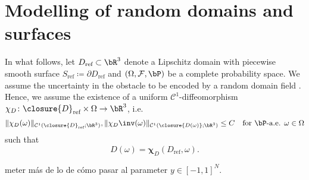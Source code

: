 \section{Modelling of random domains and surfaces}

In what follows, let $D_{\text{ref}} \subset \bR^3$ denote a Lipschitz domain with piecewise smooth surface $S_{\text{ref}} \coloneq \partial D_{\text{ref}}$ and $(\Omega, \mathcal{F}, \bP)$ be a complete probability space.
We assume the uncertainty in the obstacle to be encoded by a random domain field .
Hence, we assume the existence of a uniform $\mathcal{C}^1$-diffeomorphism $\mathbf{\chi}_D \colon \closure{D}_{\text{ref}} \times \Omega \to \bR^3$, i.e.
\[
    \lVert \mathbf{\chi}_D (\omega)\rVert _{\mathcal{C}^1(\closure{D}_{\text{ref}};\bR^3)}, \lVert \mathbf{\chi}_D\inv (\omega)\rVert _{\mathcal{C}^1(\closure{D(\omega)};\bR^3)} \leq C  \quad \text{for } \bP\text{-a.e. } \omega \in \Omega
\]
such that
\[
    D(\omega) = \mathbf{\chi}_D (D_{\text{ref}}, \omega).
\]

meter más de lo de cómo pasar al parameter $y\in [-1,1]^N$.